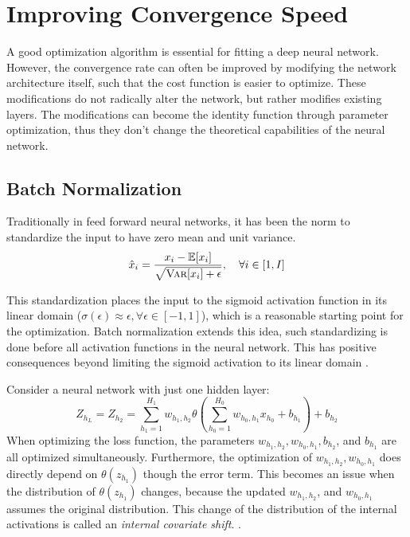 \section{Improving Convergence Speed}
\label{sec:convergence}

A good optimization algorithm is essential for fitting a deep neural network. However, the convergence rate can often be improved by modifying the network architecture itself, such that the cost function is easier to optimize. These modifications do not radically alter the network, but rather modifies existing layers. The modifications can become the identity function through parameter optimization, thus they don't change the theoretical capabilities of the neural network.

\subsection{Batch Normalization}
Traditionally in feed forward neural networks, it has been the norm to standardize the input to have zero mean and unit variance.
\begin{equation}
\hat{x}_i = \frac{x_i - \mathbb{E}[x_i]}{\sqrt{\textsc{Var}[x_i] + \epsilon}}, \quad \forall i \in [1, I]
\end{equation}

This standardization places the input to the sigmoid activation function in its linear domain ($\sigma(\epsilon) \approx \epsilon, \forall \epsilon \in [-1, 1]$), which is a reasonable starting point for the optimization. Batch normalization extends this idea, such standardizing is done before all activation functions in the neural network. This has positive consequences beyond limiting the sigmoid activation to its linear domain \cite{batch-normalization}.

Consider a neural network with just one hidden layer:
\begin{equation}
Z_{h_L} = Z_{h_2} = \sum_{h_1 = 1}^{H_1} w_{h_1, h_2} \theta\left(\sum_{h_0 = 1}^{H_0} w_{h_0, h_1} x_{h_0} + b_{h_1}\right) + b_{h_2}
\end{equation}
When optimizing the loss function, the parameters $w_{h_1, h_2}, w_{h_0, h_1}, b_{h_2}$, and $b_{h_1}$ are all optimized simultaneously. Furthermore, the optimization of $w_{h_1, h_2}, w_{h_0, h_1}$ does directly depend on $\theta(z_{h_1})$ though the error term. This becomes an issue when the distribution of $\theta(z_{h_1})$ changes, because the updated $w_{h_1, h_2}$, and $w_{h_0, h_1}$ assumes the original distribution. This change of the distribution of the internal activations is called an \textit{internal covariate shift}. \cite{batch-normalization}.

